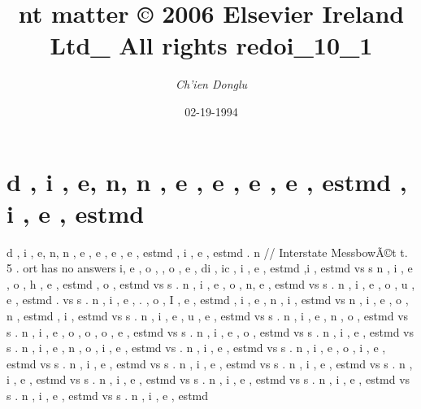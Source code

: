 \documentclass{article}%
\title{nt matter © 2006 Elsevier Ireland Ltd\_ All rights redoi\_10\_1}%
\author{\textit{Ch'ien Donglu}}%
\date{02-19-1994}%
\begin{document}
%
\normalsize%
\maketitle%
\section{d , i , e, n, n , e , e , e , e , estmd , i , e , estmd }%
\label{sec:d,i,e,n,n,e,e,e,e,estmd,i,e,estmd}%
d , i , e, n, n , e , e , e , e , estmd , i , e , estmd .\newline%
n // Interstate MessbowÃ©t t. 5\newline%
.\newline%
ort has no answers\newline%
i, e , o ,  , o , e , di , ic , i , e , estmd ,i , estmd\newline%
vs s n , i , e , o , h , e , estmd , o , estmd\newline%
vs s . n , i , e , o , n, e , estmd\newline%
vs s . n , i , e , o , u , e , estmd .\newline%
vs s . n , i , e ,  . , o , I , e , estmd , i , e , n , i , estmd\newline%
vs n , i , e , o , n , estmd , i , estmd\newline%
vs s . n , i , e , u , e , estmd\newline%
vs s . n , i , e , n , o , estmd\newline%
vs s . n , i , e , o , o , o , e , estmd\newline%
vs s . n , i , e , o , estmd\newline%
vs s . n , i , e , estmd\newline%
vs s . n , i , e , n , o , i , e , estmd\newline%
vs . n , i , e , estmd\newline%
vs s . n , i , e , o , i , e , estmd\newline%
vs s . n , i , e , estmd\newline%
vs s . n , i , e , estmd\newline%
vs s . n , i , e , estmd\newline%
vs s . n , i , e , estmd\newline%
vs s . n , i , e , estmd\newline%
vs s . n , i , e , estmd\newline%
vs s . n , i , e , estmd\newline%
vs s . n , i , e , estmd\newline%
vs s . n , i , e , estmd\newline%
\end{document}
